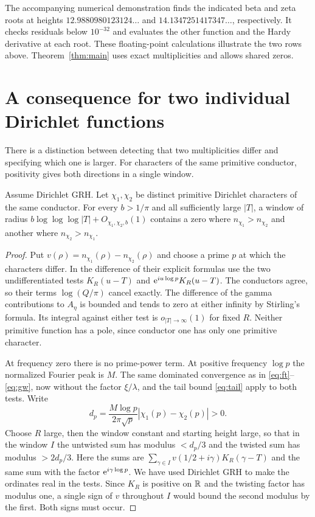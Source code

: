\documentclass[11pt,letterpaper]{article}
\begin{document}
The accompanying numerical demonstration finds the indicated beta and zeta roots at heights $12.9880980123124\ldots$ and $14.1347251417347\ldots$, respectively. It checks residuals below $10^{-32}$ and evaluates the other function and the Hardy derivative at each root. These floating-point calculations illustrate the two rows above. Theorem~\ref{thm:main} uses exact multiplicities and allows shared zeros.

\section{A consequence for two individual Dirichlet functions}
There is a distinction between detecting that two multiplicities differ and specifying which one is larger. For characters of the same primitive conductor, positivity gives both directions in a single window.

\begin{corollary}\label{cor:directed}
Assume Dirichlet GRH. Let $\chi_1,\chi_2$ be distinct primitive Dirichlet characters of the same conductor. For every $b>1/\pi$ and all sufficiently large $|T|$, a window of radius $b\log\log\log|T|+O_{\chi_1,\chi_2,b}(1)$ contains a zero where $n_{\chi_1}>n_{\chi_2}$ and another where $n_{\chi_2}>n_{\chi_1}$.
\end{corollary}
\begin{proof}
Put $v(\rho)=n_{\chi_1}(\rho)-n_{\chi_2}(\rho)$ and choose a prime $p$ at which the characters differ. In the difference of their explicit formulas use the two undifferentiated tests $K_R(u-T)$ and $\mathrm e^{iu\log p}K_R(u-T)$. The conductors agree, so their terms $\log(Q/\pi)$ cancel exactly. The difference of the gamma contributions to $A_\eta$ is bounded and tends to zero at either infinity by Stirling's formula. Its integral against either test is $o_{|T|\to\infty}(1)$ for fixed $R$. Neither primitive function has a pole, since conductor one has only one primitive character.

At frequency zero there is no prime-power term. At positive frequency $\log p$ the normalized Fourier peak is $M$. The same dominated convergence as in \eqref{eq:ft}--\eqref{eq:gw}, now without the factor $\xi/\lambda$, and the tail bound \eqref{eq:tail} apply to both tests. Write
\[
 d_p=\frac{M\log p}{2\pi\sqrt p}|\chi_1(p)-\chi_2(p)|>0 .
\]
Choose $R$ large, then the window constant and starting height large, so that in the window $I$ the untwisted sum has modulus $< d_p/3$ and the twisted sum has modulus $>2d_p/3$. Here the sums are $\sum_{\gamma\in I} v(1/2+i\gamma)K_R(\gamma-T)$ and the same sum with the factor $\mathrm e^{i\gamma\log p}$. We have used Dirichlet GRH to make the ordinates real in the tests. Since $K_R$ is positive on $\mathbb R$ and the twisting factor has modulus one, a single sign of $v$ throughout $I$ would bound the second modulus by the first. Both signs must occur.
\end{proof}
\end{document}
